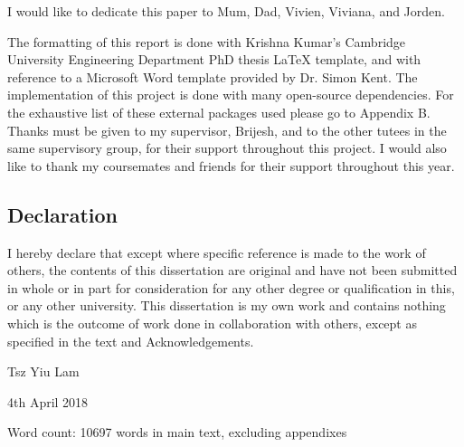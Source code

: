 
\begin{acknowledgements}      

\begin{center}
I would like to dedicate this paper to Mum, Dad, Vivien, Viviana, and Jorden.\\
\end{center}

The formatting of this report is done with Krishna Kumar's Cambridge University Engineering Department PhD thesis 
LaTeX template, and with reference to a Microsoft Word template provided by Dr. Simon Kent. 
The implementation of this project is done with many open-source dependencies.
For the exhaustive list of these external packages used please go to Appendix B.\\

Thanks must be given to my supervisor, Brijesh, and to the other tutees in the same supervisory group, 
for their support throughout this project. I would also like to thank my coursemates and friends for their 
support throughout this year.\\

\begin{center}
\section*{Declaration}
\end{center}
\vspace{1cm}
I hereby declare that except where specific reference is made to the work of 
others, the contents of this dissertation are original and have not been 
submitted in whole or in part for consideration for any other degree or 
qualification in this, or any other university. This dissertation is my own 
work and contains nothing which is the outcome of work done in collaboration 
with others, except as specified in the text and Acknowledgements.

\begin{flushright}
Tsz Yiu Lam

4th April 2018
\end{flushright}
\vspace{1cm}
\begin{center}
Word count: 10697 words in main text, excluding appendixes
\end{center}
\end{acknowledgements}
